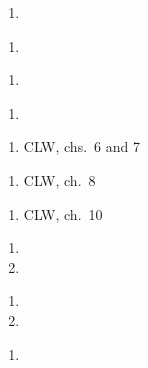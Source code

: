 \documentclass{article}
\begin{document}
\dia{}
\begin{enumerate}
\item {}
\end{enumerate}

\dia{}
\begin{enumerate}
\item {}
\end{enumerate}


\dia{}
\begin{enumerate}
\item {}
\end{enumerate}


\dia{}
\begin{enumerate}
\item {}
\end{enumerate}


\dia{}
\begin{enumerate}
\item CLW, chs.~6 and 7
\end{enumerate}

\dia{}
\begin{enumerate}
\item CLW, ch.~8
\end{enumerate}


\dia{}
\begin{enumerate}
  \item CLW, ch.~10
\end{enumerate}

\dia{}
\begin{enumerate}
\item {}
\item {}
\end{enumerate}

\dia{}
\begin{enumerate}
\item {}
\item {}
\end{enumerate}

\dia{}
\begin{enumerate}
\item {}
\end{enumerate}
\end{document}
